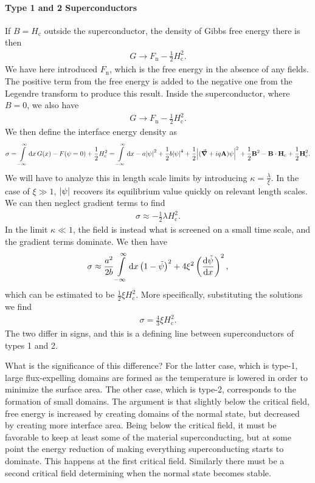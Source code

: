 \paragraph{Type 1 and 2 Superconductors}
If $B = H_{\text{c}}$ outside the superconductor, the density of Gibbs free energy there is then
\begin{align*}
	G \to F_{\text{n}} - \frac{1}{2}H_{\text{c}}^{2}.
\end{align*}
We have here introduced $F_{\text{n}}$, which is the free energy in the absence of any fields. The positive term from the free energy is added to the negative one from the Legendre transform to produce this result. Inside the superconductor, where $B = 0$, we also have
\begin{align*}
	G \to F_{\text{n}} - \frac{1}{2}H_{\text{c}}^{2}.
\end{align*}
We then define the interface energy density as
\begin{align*}
	\sigma = \int\limits_{-\infty}^{\infty}\dd{x}G(x) - F(\psi = 0) + \frac{1}{2}H_{\text{c}}^{2} = \int\limits_{-\infty}^{\infty}\dd{x}-a\abs{\psi}^{2} + \frac{1}{2}b\abs{\psi}^{4} + \frac{1}{2}\abs{(\grad{} + iq\vb{A})\psi}^{2} + \frac{1}{2}\vb{B}^{2} - \vb{B}\cdot\vb{H}_{\text{c}} + \frac{1}{2}\vb{H}_{\text{c}}^{2}.
\end{align*}
We will have to analyze this in length scale limits by introducing $\kappa = \frac{\lambda}{\xi}$. In the case of $\xi \gg 1$, $\abs{\psi}$ recovers its equilibrium value quickly on relevant length scales. We can then neglect gradient terms to find
\begin{align*}
	\sigma \approx -\frac{1}{2}\lambda H_{\text{c}}^{2}.
\end{align*}
In the limit $\kappa \ll 1$, the field is instead what is screened on a small time scale, and the gradient terms dominate. We then have
\begin{align*}
	\sigma \approx \frac{a^{2}}{2b}\int\limits_{-\infty}^{\infty}\dd{x}\left(1 - \tilde{\psi}\right)^{2} + 4\xi^{2}\left(\dv{\tilde{\psi}}{x}\right)^{2},
\end{align*}
which can be estimated to be $\frac{1}{2}\xi H_{\text{c}}^{2}$. More specifically, substituting the solutions we find
\begin{align*}
	\sigma = \frac{4}{3}\xi H_{\text{c}}^{2}.
\end{align*}
The two differ in signs, and this is a defining line between superconductors of types 1 and 2.

What is the significance of this difference? For the latter case, which is type-1, large flux-expelling domains are formed as the temperature is lowered in order to minimize the surface area. The other case, which is type-2, corresponds to the formation of small domains. The argument is that slightly below the critical field, free energy is increased by creating domains of the normal state, but decreased by creating more interface area. Being below the critical field, it must be favorable to keep at least some of the material superconducting, but at some point the energy reduction of making everything superconducting starts to dominate. This happens at the first critical field. Similarly there must be a second critical field determining when the normal state becomes stable.

